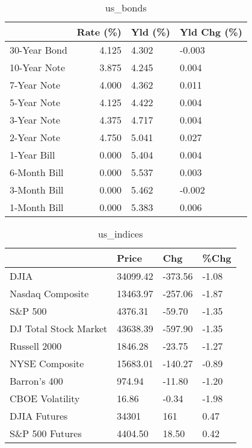 \documentclass{article}%
\begin{document}
%


\begin{table}[htbp]%
\caption{us\_bonds}%
\centering%
\begin{adjustbox}{width=1\textwidth}%
\begin{tabular}{lrll}
\toprule
             &  Rate (\%) & Yld (\%) & Yld Chg (\%) \\
\midrule
30-Year Bond &     4.125 &   4.302 &      -0.003 \\
10-Year Note &     3.875 &   4.245 &       0.004 \\
 7-Year Note &     4.000 &   4.362 &       0.011 \\
 5-Year Note &     4.125 &   4.422 &       0.004 \\
 3-Year Note &     4.375 &   4.717 &       0.004 \\
 2-Year Note &     4.750 &   5.041 &       0.027 \\
 1-Year Bill &     0.000 &   5.404 &       0.004 \\
6-Month Bill &     0.000 &   5.537 &       0.003 \\
3-Month Bill &     0.000 &   5.462 &      -0.002 \\
1-Month Bill &     0.000 &   5.383 &       0.006 \\
\bottomrule
\end{tabular}
%
\end{adjustbox}%
\end{table}

%


\begin{table}[htbp]%
\caption{us\_indices}%
\centering%
\begin{adjustbox}{width=1\textwidth}%
\begin{tabular}{llll}
\toprule
                      &    Price &     Chg &  \%Chg \\
\midrule
                 DJIA & 34099.42 & -373.56 & -1.08 \\
     Nasdaq Composite & 13463.97 & -257.06 & -1.87 \\
              S\&P 500 &  4376.31 &  -59.70 & -1.35 \\
DJ Total Stock Market & 43638.39 & -597.90 & -1.35 \\
         Russell 2000 &  1846.28 &  -23.75 & -1.27 \\
       NYSE Composite & 15683.01 & -140.27 & -0.89 \\
         Barron's 400 &   974.94 &  -11.80 & -1.20 \\
      CBOE Volatility &    16.86 &   -0.34 & -1.98 \\
         DJIA Futures &    34301 &     161 &  0.47 \\
      S\&P 500 Futures &  4404.50 &   18.50 &  0.42 \\
\bottomrule
\end{tabular}
%
\end{adjustbox}%
\end{table}
\end{document}
